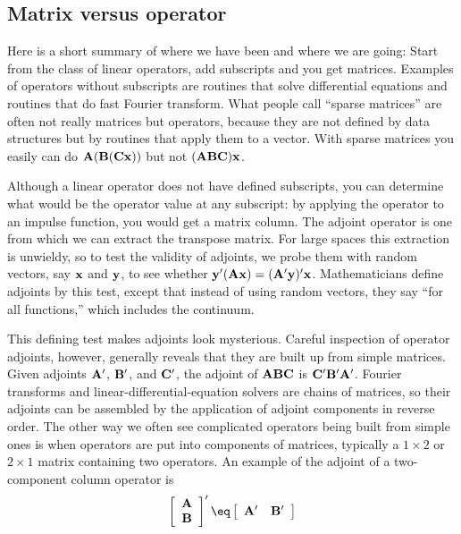 \subsection{Matrix versus operator}
Here is a short summary of where we have been and where we are going:
Start from the class of linear operators, add subscripts
and you get matrices.  Examples of operators without subscripts
are routines that solve differential equations and
routines that do fast Fourier transform.
What people call ``sparse matrices'' are often not really matrices
but operators,
because they are not defined by data structures
but by routines that apply them to a vector.
With sparse matrices you easily can do
$\bold A(\bold B(\bold C\bold x))$
but not
$(\bold A\bold B\bold C)\bold x$.
\par
Although a linear operator does not have defined subscripts,
you can determine what would be the operator value at any subscript:
by applying the operator to an impulse function, you would get a matrix column.
The adjoint operator is one from which we can extract the transpose matrix.
For large spaces this extraction is unwieldy,
so to test the validity of adjoints,
we probe them with random vectors,
say $\bold x$ and $\bold y$,
to see whether
$\bold y'(\bold A\bold x)=(\bold A'\bold y)'\bold x$.
Mathematicians define adjoints by this test,
except that instead of using random vectors,
they say ``for all functions,'' which includes the continuum.
\par
This defining test makes adjoints look mysterious.
Careful inspection of operator adjoints,
however, generally reveals that they are built up from simple matrices.
Given adjoints
$\bold A'$,
$\bold B'$,
and
$\bold C'$,
the adjoint of
$\bold A\bold B\bold C$
is
$\bold C'\bold B'\bold A'$.
Fourier transforms and linear-differential-equation solvers
are chains of matrices,
so their adjoints can be assembled
by the application of adjoint components in reverse order.
The other way we often see complicated operators being built from simple ones
is when operators are put into components of matrices,
typically a
$1\times 2$
or
$2\times 1$
matrix containing two operators.
An example of the adjoint of a two-component column operator is
\begin{equation}
 \left[
  \begin{array}{c}
   \bold A \\
   \bold B
  \end{array}
 \right]'
\eq
 \left[
  \begin{array}{cc}
   \bold A' & \bold B'
  \end{array}
 \right]
\end{equation}
